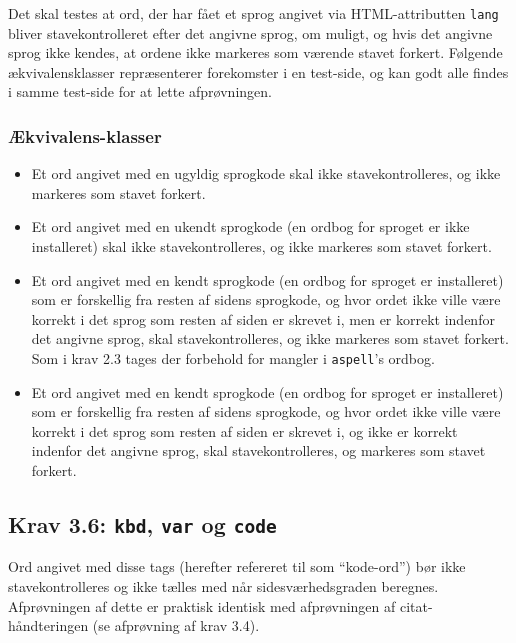 \documentclass[a4paper,oneside,article]{memoir}
\begin{document}
Det skal testes at ord, der har fået et sprog angivet via
HTML-attributten \texttt{lang} bliver stavekontrolleret efter det
angivne sprog, om muligt, og hvis det angivne sprog ikke kendes, at
ordene ikke markeres som værende stavet forkert. Følgende
ækvivalensklasser repræsenterer forekomster i en test-side, og kan
godt alle findes i samme test-side for at lette afprøvningen.

\subsubsection{Ækvivalens-klasser}
\begin{itemize}
\item Et ord angivet med en ugyldig sprogkode skal ikke
  stavekontrolleres, og ikke markeres som stavet forkert.
\item Et ord angivet med en ukendt sprogkode (en ordbog for sproget er
  ikke installeret) skal ikke stavekontrolleres, og ikke markeres som
  stavet forkert.
\item Et ord angivet med en kendt sprogkode (en ordbog for sproget er
  installeret) som er forskellig fra resten af sidens sprogkode, og
  hvor ordet ikke ville være korrekt i det sprog som resten af siden
  er skrevet i, men er korrekt indenfor det angivne sprog, skal
  stavekontrolleres, og ikke markeres som stavet forkert. Som i krav
  2.3 tages der forbehold for mangler i \texttt{aspell}'s ordbog.
\item Et ord angivet med en kendt sprogkode (en ordbog for sproget er
  installeret) som er forskellig fra resten af sidens sprogkode, og
  hvor ordet ikke ville være korrekt i det sprog som resten af siden
  er skrevet i, og ikke er korrekt indenfor det angivne sprog, skal
  stavekontrolleres, og markeres som stavet forkert.
\end{itemize}

\subsection{Krav 3.6: \texttt{kbd}, \texttt{var} og \texttt{code}}

Ord angivet med disse tags (herefter refereret til som ``kode-ord'')
bør ikke stavekontrolleres og ikke tælles med når sidesværhedsgraden
beregnes. Afprøvningen af dette er praktisk identisk med afprøvningen
af citat-håndteringen (se afprøvning af krav 3.4).
\end{document}
